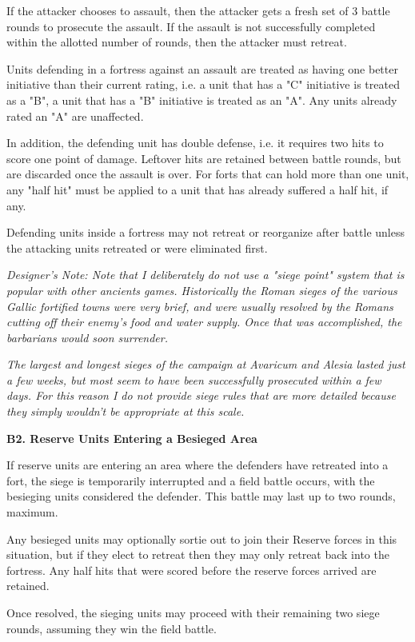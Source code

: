 If the attacker chooses to assault, then the attacker gets a fresh set of 3 battle rounds to prosecute the assault. If the assault is not successfully completed within the allotted number of rounds, then the attacker must retreat.

Units defending in a fortress against an assault are treated as having one better initiative than their current rating, i.e. a unit that has a "C" initiative is treated as a "B", a unit that has a "B" initiative is treated as an "A". Any units already rated an "A" are unaffected.

In addition, the defending unit has double defense, i.e. it requires two hits to score one point of damage. Leftover hits are retained between battle rounds, but are discarded once the assault is over. For forts that can hold more than one unit, any "half hit" must be applied to a unit that has already suffered a half hit, if any.

Defending units inside a fortress may not retreat or reorganize after battle unless the attacking units retreated or were eliminated first.

\textit{Designer's Note: Note that I deliberately do not use a "siege point" system that is popular with other ancients games. Historically the Roman sieges of the various Gallic fortified towns were very brief, and were usually resolved by the Romans cutting off their enemy's food and water supply. Once that was accomplished, the barbarians would soon surrender.}

\textit{The largest and longest sieges of the campaign at Avaricum and Alesia lasted just a few weeks, but most seem to have been successfully prosecuted within a few days. For this reason I do not provide siege rules that are more detailed because they simply wouldn't be appropriate at this scale.}

\textbf{B2. Reserve Units Entering a Besieged Area}

If reserve units are entering an area where the defenders have retreated into a fort, the siege is temporarily interrupted and a field battle occurs, with the besieging units considered the defender. This battle may last up to two rounds, maximum. 

Any besieged units may optionally sortie out to join their Reserve forces in this situation, but if they elect to retreat then they may only retreat back into the fortress. Any half hits that were scored before the reserve forces arrived are retained.

Once resolved, the sieging units may proceed with their remaining two siege rounds, assuming they win the field battle.

